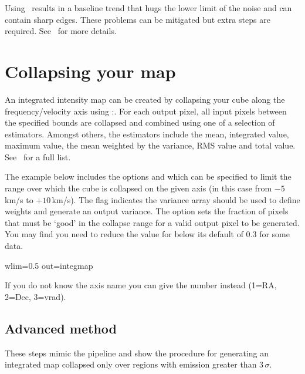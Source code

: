 \documentclass[11pt,oneside,chapters]{starlink}
\begin{document}
Using \findback\ results in a baseline trend that hugs the lower limit
of the noise and can contain sharp edges. These problems can be
mitigated but extra steps are required. See \cupidsun\ for more
details.

\section{Collapsing your map}

An integrated intensity map can be created by collapsing your cube
along the frequency/velocity axis using \Kappa:\collapse. For each
output pixel, all input pixels between the specified bounds are
collapsed and combined using one of a selection of estimators. Amongst
others, the estimators include the mean, integrated value, maximum
value, the mean weighted by the variance, RMS value and total value.
See \kappasun\ for a full list.

The example below includes the options  and 
which can be specified to limit the range over which the cube is
collapsed on the given axis (in this case from $-5$\,km/s to $+10$\,km/s).
The  flag indicates the variance array should be used
to define weights and generate an output variance. The option
 sets the fraction of pixels that must be `good' in the
collapse range for a valid output pixel to be generated. You may find
you need to reduce the value for  below its default of 0.3
for some data.

\begin{terminalv}
  wlim=0.5 out=integmap
\end{terminalv}
If you do not know the axis name you can give the number instead
(1=RA, 2=Dec, 3=vrad).

\subsection{Advanced method}

These steps mimic the pipeline and show the procedure for generating
an integrated map collapsed only over regions with emission greater
than 3\,$\sigma$.
\end{document}

